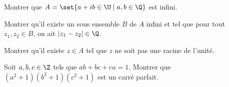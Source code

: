 \documentclass[11pt,a4paper]{article}
\begin{document}
\begin{exercise}
\begin{questions}
\item Montrer que $A=\set{a+ib \in\U \mid a,b\in\Q}$ est infini.
\item Montrer qu'il existe un sous ensemble $B$ de $A$ infini 
et tel que pour tout $z_1, z_2 \in B$, on ait $|z_1 - z_2|\in\Q$.
\item Montrer qu'il existe $z\in A$ tel que $z$ ne soit pas une racine de l'unité.
\end{questions}
\end{exercise}

\begin{exercise}
Soit $a,b,c\in\Z$ tels que $ab+bc+ca=1$.
Montrer que $(a^2+1)(b^2+1)(c^2+1)$ est un carré parfait.
\end{exercise}
\end{document}
